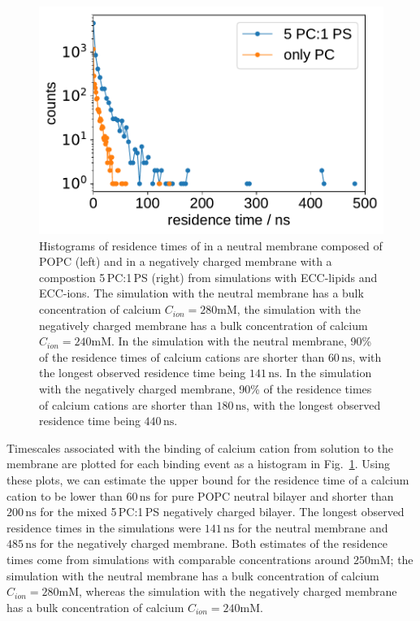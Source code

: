 \begin{figure}[tb!]
  \centering
  \includegraphics[width=\figwidth]{../img/histogram_bound_times_26CaCl2_comparison_PC-PCPS.pdf}
  \caption{\label{fig:hist_residence_times}
   Histograms of residence times of  
   in a neutral membrane composed of POPC (left)
   and in a negatively charged membrane with a compostion 5\,PC:1\,PS (right)
   from simulations with ECC-lipids and ECC-ions.
   The simulation with the neutral membrane has a bulk concentration of calcium $C_{ion} = 280\mathrm{mM}$, 
   the simulation with the negatively charged membrane has a bulk concentration of calcium $C_{ion} = 240\mathrm{mM}$. 
   In the simulation with the neutral membrane, 
   90\% of the residence times of calcium cations are
   shorter than $60\,\mathrm{ns}$, %
   with the longest observed residence time being $141\,\mathrm{ns}$. 
   In the simulation with the negatively charged membrane, 
   90\% of the residence times of calcium cations are
   shorter than $180\,\mathrm{ns}$, %
   with the longest observed residence time being $440\,\mathrm{ns}$. 
   }
\end{figure}


Timescales associated with the binding of calcium cation from solution to the membrane
are plotted for each binding event as a histogram in Fig.~\ref{fig:hist_residence_times}. 
Using these plots, we can estimate the upper bound for the residence time of a calcium cation 
to be lower than $60\,\mathrm{ns}$ for pure POPC neutral bilayer 
and shorter than $200\,\mathrm{ns}$ for the mixed 5\,PC:1\,PS negatively charged bilayer. 
The longest observed residence times in the simulations were $141\,\mathrm{ns}$ for the neutral membrane 
and $485\,\mathrm{ns}$ for the negatively charged membrane. 
Both estimates of the residence times come from simulations with comparable concentrations around $250\mathrm{mM}$;
the simulation with the neutral membrane has a bulk concentration of calcium $C_{ion} = 280\mathrm{mM}$, 
whereas the simulation with the negatively charged membrane has a bulk concentration of calcium $C_{ion} = 240\mathrm{mM}$. 

